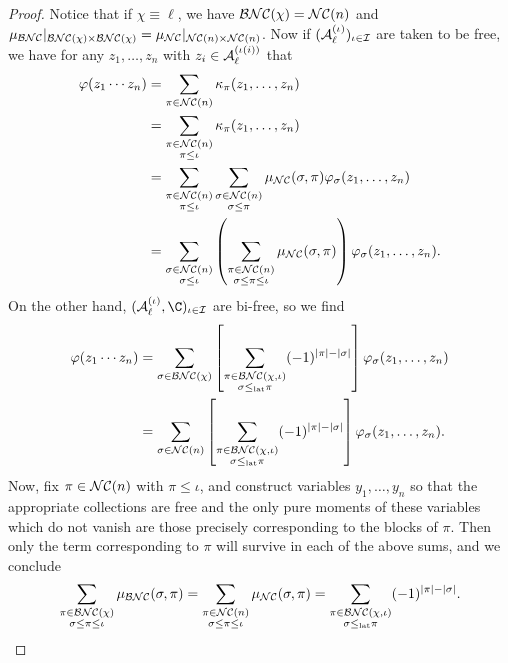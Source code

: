 \begin{proof}
	Notice that if $\chi\equiv\ell$, we have $\mathcal{BNC}(\chi) = \mathcal{NC}(n)$ and $\mu_{\mathcal{BNC}}|_{\mathcal{BNC}(\chi)\times\mathcal{BNC}(\chi)} = \mu_{\mathcal{NC}}|_{\mathcal{NC}(n)\times\mathcal{NC}(n)}$.
	Now if $(\mathcal{A}_\ell^{(\iota)})_{\iota\in\mathcal{I}}$ are taken to be free, we have for any $z_1, \ldots, z_n$ with $z_i \in \mathcal{A}_\ell^{(\iota(i))}$ that
	\begin{align*}
		\varphi(z_1\cdots z_n)
		&= \sum_{\pi\in\mathcal{NC}(n)}\kappa_\pi(z_1, \ldots, z_n) \\
		&= \sum_{\substack{\pi\in\mathcal{NC}(n)\\\pi\leq\iota}} \kappa_\pi(z_1, \ldots, z_n) \\
		&= \sum_{\substack{\pi\in\mathcal{NC}(n)\\\pi\leq\iota}} \sum_{\substack{\sigma\in\mathcal{NC}(n)\\\sigma\leq\pi}} \mu_{\mathcal{NC}}(\sigma, \pi)\varphi_\sigma(z_1, \ldots, z_n) \\
		&= \sum_{\substack{\sigma\in\mathcal{NC}(n)\\\sigma\leq\iota}} \left(\sum_{\substack{\pi\in\mathcal{NC}(n)\\\sigma\leq\pi\leq\iota}} \mu_{\mathcal{NC}}(\sigma, \pi)\right) \varphi_\sigma(z_1, \ldots, z_n). \\
	\end{align*}
	On the other hand, $(\A_\ell^{(\iota)}, \C)_{\iota\in\I}$ are bi-free, so we find
	\begin{align*}
		\varphi(z_1\cdots z_n)
		&= \sum_{\sigma \in \mathcal{BNC}(\chi)}\left[\sum_{\substack{\pi \in \mathcal{BNC}(\chi, \iota) \\ \sigma \leq_{{\operatorname{lat}}} \pi}} (-1)^{\left|\pi\right| - \left|\sigma\right|}\right] \varphi_\sigma(z_1, \ldots, z_n) \\
		&= \sum_{\sigma \in \mathcal{NC}(n)}\left[\sum_{\substack{\pi \in \mathcal{BNC}(\chi, \iota) \\ \sigma \leq_{{\operatorname{lat}}} \pi}} (-1)^{\left|\pi\right| - \left|\sigma\right|}\right] \varphi_\sigma(z_1, \ldots, z_n). \\
	\end{align*}
	Now, fix $\pi \in \mathcal{NC}(n)$ with $\pi \leq \iota$, and construct variables $y_1, \ldots, y_n$ so that the appropriate collections are free and the only pure moments of these variables which do not vanish are those precisely corresponding to the blocks of $\pi$.
	Then only the term corresponding to $\pi$ will survive in each of the above sums, and we conclude
	$$
	\sum_{\substack{\pi\in\mathcal{BNC}(\chi)\\\sigma\leq\pi\leq\iota}} \mu_{\mathcal{BNC}}(\sigma, \pi)
	=
	\sum_{\substack{\pi\in\mathcal{NC}(n)\\\sigma\leq\pi\leq\iota}} \mu_{\mathcal{NC}}(\sigma, \pi)
	=
	\sum_{\substack{\pi \in \mathcal{BNC}(\chi, \iota) \\ \sigma \leq_{{\operatorname{lat}}} \pi}} (-1)^{\left|\pi\right| - \left|\sigma\right|}.
	$$
\end{proof}

